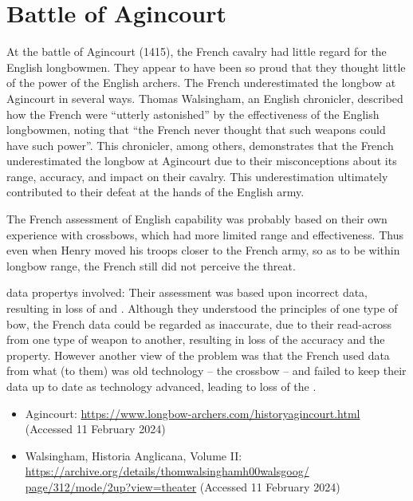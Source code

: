 \section{Battle of Agincourt}\label{bkm:incacc:agincourt}
  At the battle of Agincourt (1415), the French cavalry had little regard for the English longbowmen.
  They appear to have been so proud that they thought little of the power of the English
  archers.
  The French underestimated the longbow at Agincourt in several ways.
  Thomas Walsingham, an English chronicler, described how the French were ``utterly astonished''
  by the effectiveness of the English longbowmen,
  noting that ``the French never thought that such weapons could have such power''.
  This chronicler, among others, demonstrates that the French underestimated the longbow at
  Agincourt due to their misconceptions about its range, \gls{accuracy}, and impact on their cavalry.
  This underestimation ultimately contributed to their defeat at the hands of the English army.

  The French assessment of English capability was probably based on their own experience with
  crossbows, which had more limited range and effectiveness. Thus even when Henry moved his troops
  closer to the French army, so as to be within longbow range, the French still did not perceive the threat.

  \Glspl{data property} involved: Their assessment was based upon incorrect data, resulting in loss of 
   and
  .
  Although they understood the principles of one type of bow, the French data could be regarded as
  inaccurate, due to their read-across from one type of weapon to another, resulting in loss of the
  \gls{accuracy} and the
   property.
  However another view of the problem was that the French used data from what (to them) was old
  technology -- the crossbow -- and failed to keep their data up to date as technology advanced,
  leading to loss of the
  .

  \begin{itemize}
  \item Agincourt:
  \href{https://www.longbow-archers.com/historyagincourt.html}
       {https://www.longbow-archers.com/historyagincourt.html}
       (Accessed 11 February 2024)
  \item Walsingham, Historia Anglicana, Volume II:
  \href{https://archive.org/details/thomwalsinghamh00walsgoog/page/312/mode/2up?view=theater}
       {https://archive.org/details/thomwalsinghamh00walsgoog/ page/312/mode/2up?view=theater}
       (Accessed 11 February 2024)

\end{itemize}

